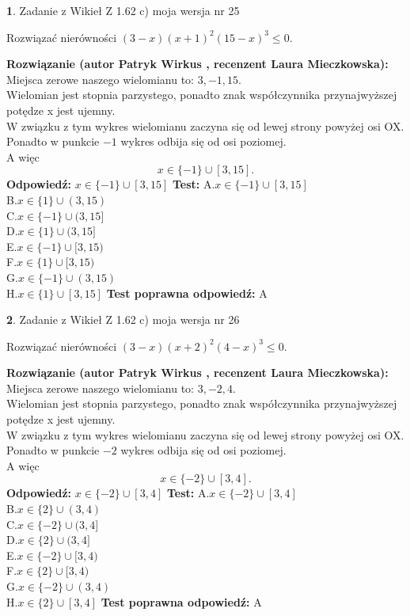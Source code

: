 \documentclass[12pt, a4paper]{article}
\theoremstyle{definition} %
\newtheorem{zad}{}
\newcommand{\zadStart}[1]{\begin{zad}#1\newline}
\newcommand{\zadStop}{\end{zad}}
\newcommand{\rozwStart}[2]{\noindent \textbf{Rozwiązanie (autor #1 , recenzent #2): }\newline}
\newcommand{\rozwStop}{\newline}
\newcommand{\odpStart}{\noindent \textbf{Odpowiedź:}\newline}
\newcommand{\odpStop}{\newline}
\newcommand{\testStart}{\noindent \textbf{Test:}\newline}
\newcommand{\testStop}{\newline}
\newcommand{\kluczStart}{\noindent \textbf{Test poprawna odpowiedź:}\newline}
\newcommand{\kluczStop}{\newline}
\begin{document}
\zadStart{Zadanie z Wikieł Z 1.62 c) moja wersja nr 25}

Rozwiązać nierówności $(3-x)(x+1)^{2}(15-x)^{3}\le0$.
\zadStop
\rozwStart{Patryk Wirkus}{Laura Mieczkowska}
Miejsca zerowe naszego wielomianu to: $3, -1, 15$.\\
Wielomian jest stopnia parzystego, ponadto znak współczynnika przy\linebreak najwyższej potędze x jest ujemny.\\ W związku z tym wykres wielomianu zaczyna się od lewej strony powyżej osi OX.\\
Ponadto w punkcie $-1$ wykres odbija się od osi poziomej.\\
A więc $$x \in \{-1\} \cup [3,15].$$
\rozwStop
\odpStart
$x \in \{-1\} \cup [3,15]$
\odpStop
\testStart
A.$x \in \{-1\} \cup [3,15]$\\
B.$x \in \{1\} \cup (3,15)$\\
C.$x \in \{-1\} \cup (3,15]$\\
D.$x \in \{1\} \cup (3,15]$\\
E.$x \in \{-1\} \cup [3,15)$\\
F.$x \in \{1\} \cup [3,15)$\\
G.$x \in \{-1\} \cup (3,15)$\\
H.$x \in \{1\} \cup [3,15]$
\testStop
\kluczStart
A
\kluczStop



\zadStart{Zadanie z Wikieł Z 1.62 c) moja wersja nr 26}

Rozwiązać nierówności $(3-x)(x+2)^{2}(4-x)^{3}\le0$.
\zadStop
\rozwStart{Patryk Wirkus}{Laura Mieczkowska}
Miejsca zerowe naszego wielomianu to: $3, -2, 4$.\\
Wielomian jest stopnia parzystego, ponadto znak współczynnika przy\linebreak najwyższej potędze x jest ujemny.\\ W związku z tym wykres wielomianu zaczyna się od lewej strony powyżej osi OX.\\
Ponadto w punkcie $-2$ wykres odbija się od osi poziomej.\\
A więc $$x \in \{-2\} \cup [3,4].$$
\rozwStop
\odpStart
$x \in \{-2\} \cup [3,4]$
\odpStop
\testStart
A.$x \in \{-2\} \cup [3,4]$\\
B.$x \in \{2\} \cup (3,4)$\\
C.$x \in \{-2\} \cup (3,4]$\\
D.$x \in \{2\} \cup (3,4]$\\
E.$x \in \{-2\} \cup [3,4)$\\
F.$x \in \{2\} \cup [3,4)$\\
G.$x \in \{-2\} \cup (3,4)$\\
H.$x \in \{2\} \cup [3,4]$
\testStop
\kluczStart
A
\kluczStop
\end{document}

